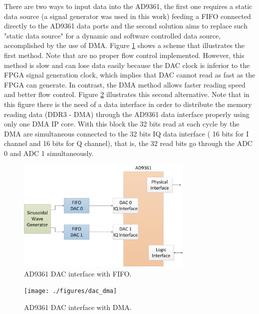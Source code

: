 There are two ways to input data into the AD9361, the first one requires a
static data source (a signal generator was used in this work) feeding a FIFO
connected directly to the AD9361 data ports and the second solution aims to
replace such "static data source" for a dynamic and software controlled data
source, accomplished by the use of DMA. Figure \ref{fig:ad9361txfifo} shows a
scheme that illustrates the first method. Note that are no proper flow control
implemented. However, this method is slow and can lose data easily because the
DAC clock is inferior to the FPGA signal generation clock, which implies that
DAC cannot read as fast as the FPGA can generate. In contrast, the DMA method
allows faster reading speed and better flow control. Figure
\ref{fig:ad9361txdma} illustrates this second alternative. Note that in this
figure there is the need of a data interface in order to distribute the memory
reading data (DDR3 - DMA) through the AD9361 data interface properly using only
one DMA IP core. With this block the 32 bits read at each cycle by the DMA are
simultaneous connected to the 32 bits IQ data interface ( 16 bits for I channel
and 16 bits for Q channel), that is, the 32 read bits go through the ADC 0 and
ADC 1 simultaneously.


\begin{figure}[htbp]
    \centering
    \includegraphics[width=0.75\textwidth]{./figures/dac_fifo}
    \caption{ AD9361 DAC interface with FIFO.
    \label{fig:ad9361txfifo}}
\end{figure}


\begin{figure}[htbp]
    \centering
    \texttt{[image: ./figures/dac\_dma]}
    \caption{ AD9361 DAC interface with DMA.
    \label{fig:ad9361txdma}}
\end{figure}

